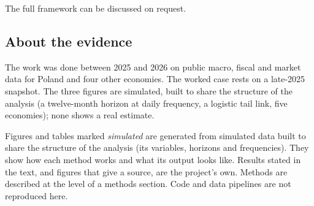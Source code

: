 \documentclass[
  british,
  a4paper,
]{article}
\newcounter{none} %
\begin{document}
The full framework can be discussed on request.

\subsection{About the evidence}\label{about-the-evidence}

The work was done between 2025 and 2026 on public macro, fiscal and
market data for Poland and four other economies. The worked case rests
on a late-2025 snapshot. The three figures are simulated, built to share
the structure of the analysis (a twelve-month horizon at daily
frequency, a logistic tail link, five economies); none shows a real
estimate.

Figures and tables marked \emph{simulated} are generated from simulated
data built to share the structure of the analysis (its variables,
horizons and frequencies). They show how each method works and what its
output looks like. Results stated in the text, and figures that give a
source, are the project's own. Methods are described at the level of a
methods section. Code and data pipelines are not reproduced here.
\end{document}
